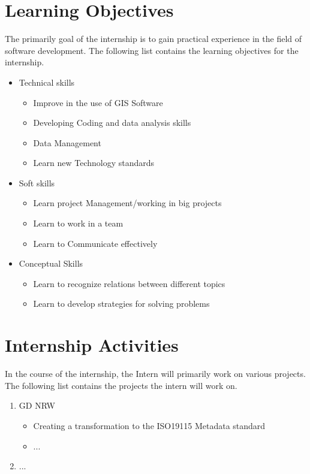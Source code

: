 \documentclass[11pt, titlepage, a4paper]{article}
\begin{document}
\section{Learning Objectives}
The primarily goal of the internship is to gain practical experience in the field of software development. The following list contains the learning objectives for the internship. 
\begin{itemize}
\item Technical skills
\begin{itemize}
    \item Improve in the use of GIS Software
    \item Developing Coding and data analysis skills
    \item Data Management
    \item Learn new Technology standards
\end{itemize}
\item Soft skills
\begin{itemize}
    \item Learn project Management/working in big projects
    \item Learn to work in a team
    \item Learn to Communicate effectively
\end{itemize}
\item Conceptual Skills
\begin{itemize}
    \item Learn to recognize relations between different topics
    \item Learn to develop strategies for solving problems
\end{itemize}
\end{itemize}

\section{Internship Activities}
In the course of the internship, the Intern will primarily work on various projects. The following list contains the projects the intern will work on.

\begin{enumerate}
    \item GD NRW
    \begin{itemize}
        \item Creating a transformation to the ISO19115 Metadata standard
        \item ...
    \end{itemize}
    \item ... 
    \end{enumerate}
\end{document}
